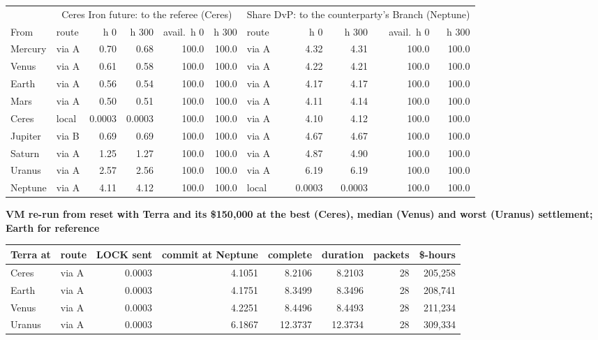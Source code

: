 \par\noindent
\begin{tabular}{llrrrrlrrrr}
\toprule
 & \multicolumn{5}{c}{Ceres Iron future: to the referee (Ceres)} & \multicolumn{5}{c}{Share DvP: to the counterparty's Branch (Neptune)}\\
\cmidrule(lr){2-6}\cmidrule(lr){7-11}
From & route & h 0 & h 300 & avail.\ h 0 & h 300 & route & h 0 & h 300 & avail.\ h 0 & h 300\\
\midrule
Mercury & via A & 0.70 & 0.68 & 100.0 & 100.0 & via A & 4.32 & 4.31 & 100.0 & 100.0\\
Venus & via A & 0.61 & 0.58 & 100.0 & 100.0 & via A & 4.22 & 4.21 & 100.0 & 100.0\\
Earth & via A & 0.56 & 0.54 & 100.0 & 100.0 & via A & 4.17 & 4.17 & 100.0 & 100.0\\
Mars & via A & 0.50 & 0.51 & 100.0 & 100.0 & via A & 4.11 & 4.14 & 100.0 & 100.0\\
Ceres & local & 0.0003 & 0.0003 & 100.0 & 100.0 & via A & 4.10 & 4.12 & 100.0 & 100.0\\
Jupiter & via B & 0.69 & 0.69 & 100.0 & 100.0 & via A & 4.67 & 4.67 & 100.0 & 100.0\\
Saturn & via A & 1.25 & 1.27 & 100.0 & 100.0 & via A & 4.87 & 4.90 & 100.0 & 100.0\\
Uranus & via A & 2.57 & 2.56 & 100.0 & 100.0 & via A & 6.19 & 6.19 & 100.0 & 100.0\\
Neptune & via A & 4.11 & 4.12 & 100.0 & 100.0 & local & 0.0003 & 0.0003 & 100.0 & 100.0\\
\bottomrule
\end{tabular}\par

\medskip
\par\noindent\textbf{VM re-run from reset with Terra and its \$150{,}000 at the best (Ceres), median (Venus) and worst (Uranus) settlement; Earth for reference}\par
\par\noindent
\begin{tabular}{llrrrrrr}
\toprule
Terra at & route & LOCK sent & commit at Neptune & complete & duration & packets & \$-hours\\
\midrule
Ceres & via A & 0.0003 & 4.1051 & 8.2106 & 8.2103 & 28 & 205{,}258\\
Earth & via A & 0.0003 & 4.1751 & 8.3499 & 8.3496 & 28 & 208{,}741\\
Venus & via A & 0.0003 & 4.2251 & 8.4496 & 8.4493 & 28 & 211{,}234\\
Uranus & via A & 0.0003 & 6.1867 & 12.3737 & 12.3734 & 28 & 309{,}334\\
\bottomrule
\end{tabular}\par
